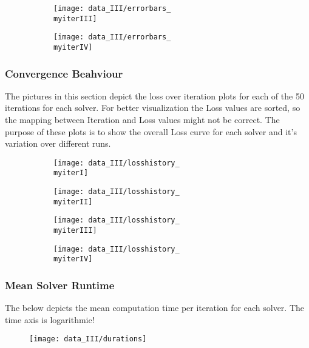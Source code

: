 \begin{figure}[h]
	\begin{subfigure}{0.5\textwidth}
		\texttt{[image: data\_III/errorbars\_\\myiterIII]}
		\label{fig:errorbars_\myiterIII_III}
	\end{subfigure}
	\begin{subfigure}{0.5\textwidth}
		\texttt{[image: data\_III/errorbars\_\\myiterIV]}
		\label{fig:errorbars_\myiterIV_III}
	\end{subfigure}
\end{figure}


\newpage


\subsubsection{Convergence Beahviour}

The pictures in this section depict the loss over iteration plots for each of the 50 iterations for each solver. For better visualization the Loss values are sorted, so the mapping between Iteration and Loss values might not be correct. The purpose of these plots is to show the overall Loss curve for each solver and it's variation over different runs.  

\begin{figure}[h]
	\begin{subfigure}{0.5\textwidth}
		\texttt{[image: data\_III/losshistory\_\\myiterI]}
		\label{fig:losshistory_\myiterI_III}
	\end{subfigure}
	\begin{subfigure}{0.5\textwidth}
		\texttt{[image: data\_III/losshistory\_\\myiterII]}
		\label{fig:losshistory_\myiterII_III}
	\end{subfigure}
\end{figure}

\begin{figure}[h]
	\begin{subfigure}{0.5\textwidth}
		\texttt{[image: data\_III/losshistory\_\\myiterIII]}
		\label{fig:losshistory_\myiterIII_III}
	\end{subfigure}
	\begin{subfigure}{0.5\textwidth}
		\texttt{[image: data\_III/losshistory\_\\myiterIV]}
		\label{fig:losshistory_\myiterIV_III}
	\end{subfigure}
\end{figure}


\newpage


\subsubsection{Mean Solver Runtime}

The below depicts the mean computation time per iteration for each solver. The time axis is logarithmic!  

\begin{figure}[h]
		\texttt{[image: data\_III/durations]}
		\label{fig:duration_III}
\end{figure}
